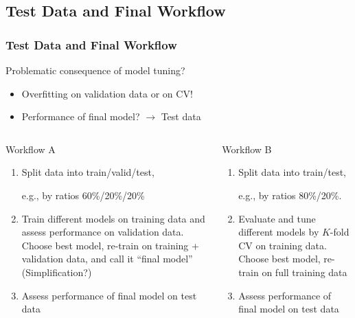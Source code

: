 \subsection{Test Data and Final Workflow}

\begin{frame}
	\frametitle{Test Data and Final Workflow}
	\begin{block}{Problematic consequence of model tuning?}
		\begin{itemize}
			\item \alert{Overfitting} on validation data or on CV!
			\item Performance of final model? $\rightarrow$ \alert{Test data}
		\end{itemize}
	\end{block}
	
	\begin{columns}[onlytextwidth]
		\begin{block}{Workflow A}
			\begin{footnotesize}
				\begin{enumerate}
					\item Split data into train/valid/test, 
					
					e.g., by ratios 60\%/20\%/20\%
					\item Train different models on training data and assess performance on validation data. Choose best model, re-train on training + validation data, and call it ``final model'' (Simplification?)
					\item Assess performance of final model on test data
				\end{enumerate}
			\end{footnotesize}
		\end{block}
		
		\begin{block}{Workflow B}
			\begin{footnotesize}
				\begin{enumerate}
					\item Split data into train/test, 
					
					e.g., by ratios 80\%/20\%.
					\item Evaluate and tune different models by $K$-fold CV on training data. Choose best model, re-train on full training data
					\item Assess performance of final model on test data
				\end{enumerate}
			\end{footnotesize}
		\end{block}
	\end{columns}
	

\end{frame}
